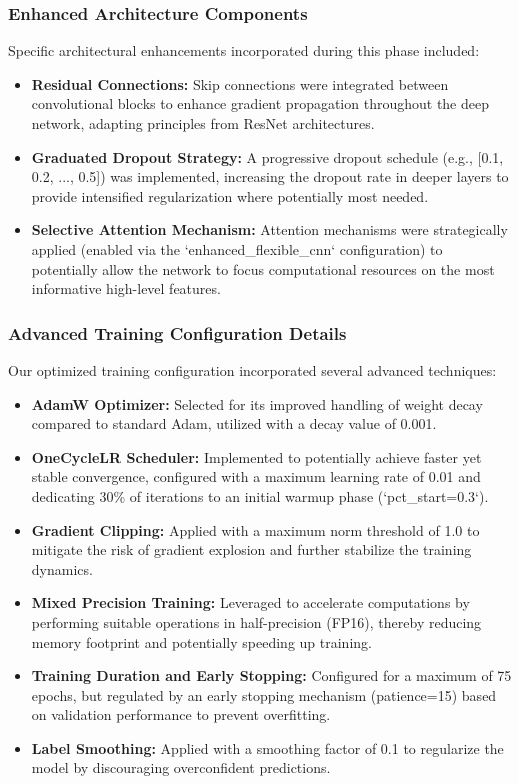 \subsubsection{Enhanced Architecture Components}
Specific architectural enhancements incorporated during this phase included:
\begin{itemize}
    \item \textbf{Residual Connections:} Skip connections were integrated between convolutional blocks to enhance gradient propagation throughout the deep network, adapting principles from ResNet architectures.
    \item \textbf{Graduated Dropout Strategy:} A progressive dropout schedule (e.g., [0.1, 0.2, ..., 0.5]) was implemented, increasing the dropout rate in deeper layers to provide intensified regularization where potentially most needed.
    \item \textbf{Selective Attention Mechanism:} Attention mechanisms were strategically applied (enabled via the `enhanced_flexible_cnn` configuration) to potentially allow the network to focus computational resources on the most informative high-level features.
\end{itemize}

\subsubsection{Advanced Training Configuration Details}
Our optimized training configuration incorporated several advanced techniques:
\begin{itemize}
    \item \textbf{AdamW Optimizer:} Selected for its improved handling of weight decay compared to standard Adam, utilized with a decay value of 0.001.
    \item \textbf{OneCycleLR Scheduler:} Implemented to potentially achieve faster yet stable convergence, configured with a maximum learning rate of 0.01 and dedicating 30\% of iterations to an initial warmup phase (`pct_start=0.3`).
    \item \textbf{Gradient Clipping:} Applied with a maximum norm threshold of 1.0 to mitigate the risk of gradient explosion and further stabilize the training dynamics.
    \item \textbf{Mixed Precision Training:} Leveraged to accelerate computations by performing suitable operations in half-precision (FP16), thereby reducing memory footprint and potentially speeding up training.
    \item \textbf{Training Duration and Early Stopping:} Configured for a maximum of 75 epochs, but regulated by an early stopping mechanism (patience=15) based on validation performance to prevent overfitting.
    \item \textbf{Label Smoothing:} Applied with a smoothing factor of 0.1 to regularize the model by discouraging overconfident predictions.
\end{itemize}


